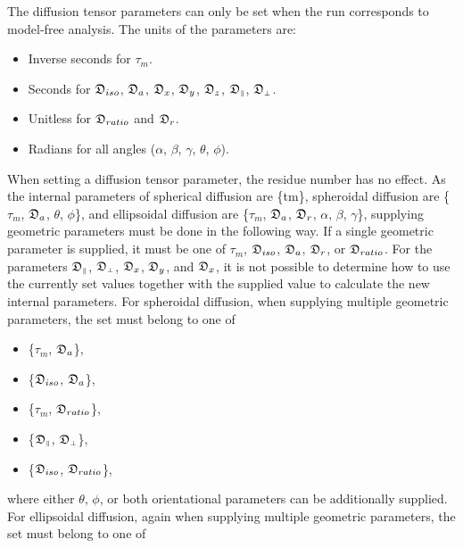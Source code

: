 The diffusion tensor parameters can only be set when the run corresponds to model-free analysis.  The units of the parameters are:


\begin{itemize}
\item[] Inverse seconds for $\tau_m$. 
\item[] Seconds for $\mathfrak{D}_{iso}$, $\mathfrak{D}_a$, $\mathfrak{D}_x$, $\mathfrak{D}_y$, $\mathfrak{D}_z$, $\mathfrak{D}_{\scriptscriptstyle \parallel}$, $\mathfrak{D}_{\scriptscriptstyle \perp}$. 
\item[] Unitless for $\mathfrak{D}_{ratio}$ and $\mathfrak{D}_r$. 
\item[] Radians for all angles ($\alpha$, $\beta$, $\gamma$, $\theta$, $\phi$). 
\end{itemize}


When setting a diffusion tensor parameter, the residue number has no effect.  As the internal parameters of spherical diffusion are \{tm\}, spheroidal diffusion are \{$\tau_m$, $\mathfrak{D}_a$, $\theta$, $\phi$\}, and ellipsoidal diffusion are \{$\tau_m$, $\mathfrak{D}_a$, $\mathfrak{D}_r$, $\alpha$, $\beta$, $\gamma$\}, supplying geometric parameters must be done in the following way.  If a single geometric parameter is supplied, it must be one of $\tau_m$, $\mathfrak{D}_{iso}$, $\mathfrak{D}_a$, $\mathfrak{D}_r$, or $\mathfrak{D}_{ratio}$.  For the parameters $\mathfrak{D}_{\scriptscriptstyle \parallel}$, $\mathfrak{D}_{\scriptscriptstyle \perp}$, $\mathfrak{D}_x$, $\mathfrak{D}_y$, and $\mathfrak{D}_x$, it is not possible to determine how to use the currently set values together with the supplied value to calculate the new internal parameters.  For spheroidal diffusion, when supplying multiple geometric parameters, the set must belong to one of


\begin{itemize}
\item[] \{$\tau_m$, $\mathfrak{D}_a$\}, 
\item[] \{$\mathfrak{D}_{iso}$, $\mathfrak{D}_a$\}, 
\item[] \{$\tau_m$, $\mathfrak{D}_{ratio}$\}, 
\item[] \{$\mathfrak{D}_{\scriptscriptstyle \parallel}$, $\mathfrak{D}_{\scriptscriptstyle \perp}$\}, 
\item[] \{$\mathfrak{D}_{iso}$, $\mathfrak{D}_{ratio}$\}, 
\end{itemize}


where either $\theta$, $\phi$, or both orientational parameters can be additionally supplied.  For ellipsoidal diffusion, again when supplying multiple geometric parameters, the set must belong to one of


